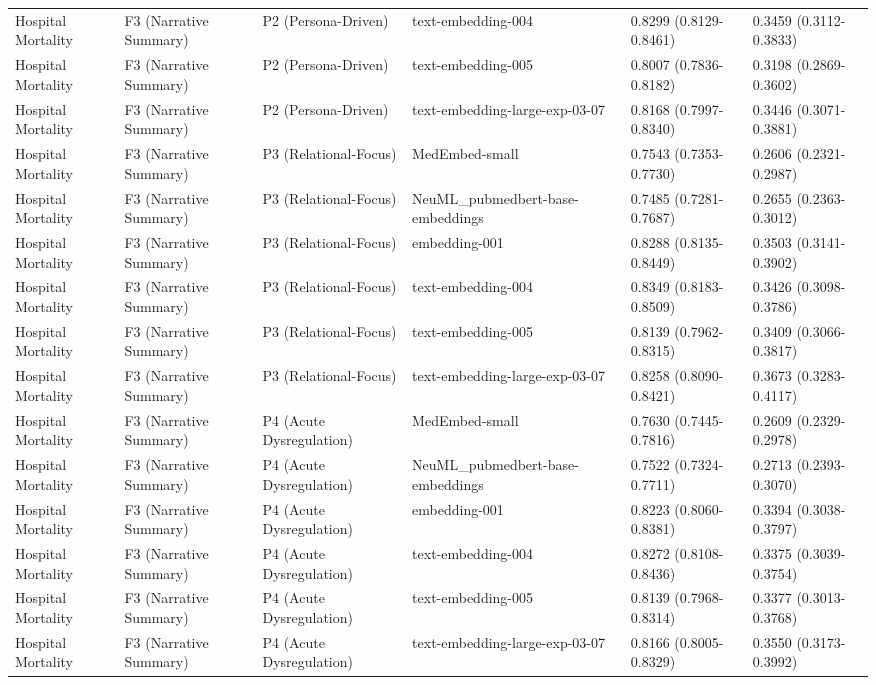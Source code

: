 \begin{tabular}{llllll}
Hospital Mortality & F3 (Narrative Summary) & P2 (Persona-Driven) & text-embedding-004 & 0.8299 (0.8129-0.8461) & 0.3459 (0.3112-0.3833) \\
Hospital Mortality & F3 (Narrative Summary) & P2 (Persona-Driven) & text-embedding-005 & 0.8007 (0.7836-0.8182) & 0.3198 (0.2869-0.3602) \\
Hospital Mortality & F3 (Narrative Summary) & P2 (Persona-Driven) & text-embedding-large-exp-03-07 & 0.8168 (0.7997-0.8340) & 0.3446 (0.3071-0.3881) \\
Hospital Mortality & F3 (Narrative Summary) & P3 (Relational-Focus) & MedEmbed-small & 0.7543 (0.7353-0.7730) & 0.2606 (0.2321-0.2987) \\
Hospital Mortality & F3 (Narrative Summary) & P3 (Relational-Focus) & NeuML\_pubmedbert-base-embeddings & 0.7485 (0.7281-0.7687) & 0.2655 (0.2363-0.3012) \\
Hospital Mortality & F3 (Narrative Summary) & P3 (Relational-Focus) & embedding-001 & 0.8288 (0.8135-0.8449) & 0.3503 (0.3141-0.3902) \\
Hospital Mortality & F3 (Narrative Summary) & P3 (Relational-Focus) & text-embedding-004 & 0.8349 (0.8183-0.8509) & 0.3426 (0.3098-0.3786) \\
Hospital Mortality & F3 (Narrative Summary) & P3 (Relational-Focus) & text-embedding-005 & 0.8139 (0.7962-0.8315) & 0.3409 (0.3066-0.3817) \\
Hospital Mortality & F3 (Narrative Summary) & P3 (Relational-Focus) & text-embedding-large-exp-03-07 & 0.8258 (0.8090-0.8421) & 0.3673 (0.3283-0.4117) \\
Hospital Mortality & F3 (Narrative Summary) & P4 (Acute Dysregulation) & MedEmbed-small & 0.7630 (0.7445-0.7816) & 0.2609 (0.2329-0.2978) \\
Hospital Mortality & F3 (Narrative Summary) & P4 (Acute Dysregulation) & NeuML\_pubmedbert-base-embeddings & 0.7522 (0.7324-0.7711) & 0.2713 (0.2393-0.3070) \\
Hospital Mortality & F3 (Narrative Summary) & P4 (Acute Dysregulation) & embedding-001 & 0.8223 (0.8060-0.8381) & 0.3394 (0.3038-0.3797) \\
Hospital Mortality & F3 (Narrative Summary) & P4 (Acute Dysregulation) & text-embedding-004 & 0.8272 (0.8108-0.8436) & 0.3375 (0.3039-0.3754) \\
Hospital Mortality & F3 (Narrative Summary) & P4 (Acute Dysregulation) & text-embedding-005 & 0.8139 (0.7968-0.8314) & 0.3377 (0.3013-0.3768) \\
Hospital Mortality & F3 (Narrative Summary) & P4 (Acute Dysregulation) & text-embedding-large-exp-03-07 & 0.8166 (0.8005-0.8329) & 0.3550 (0.3173-0.3992) \\

\end{tabular}
